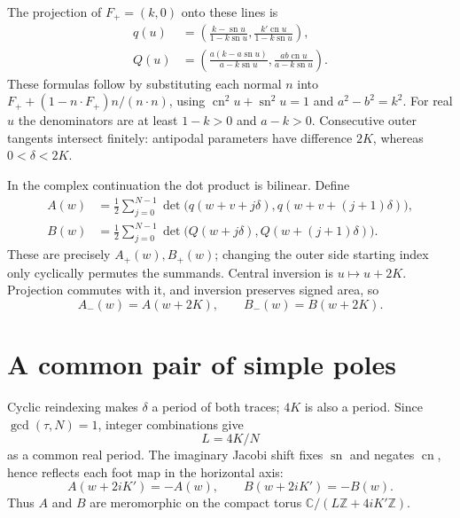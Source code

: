 \documentclass[11pt]{article}
\newcommand{\sn}{\operatorname{sn}}
\newcommand{\cn}{\operatorname{cn}}
\begin{document}
The projection of $F_+=(k,0)$ onto these lines is
\begin{align}\label{eq:q}
 q(u)&=\left(\frac{k-\sn u}{1-k\sn u},
                  \frac{k'\cn u}{1-k\sn u}\right),\\
 Q(u)&=\left(\frac{a(k-a\sn u)}{a-k\sn u},
                  \frac{ab\cn u}{a-k\sn u}\right).\label{eq:Q}
\end{align}
These formulas follow by substituting each normal $n$ into
$F_++(1-n\cdot F_+)n/(n\cdot n)$, using
$\cn^2u+\sn^2u=1$ and $a^2-b^2=k^2$.
For real $u$ the denominators are at least $1-k>0$ and $a-k>0$.
Consecutive outer tangents intersect finitely: antipodal parameters
have difference $2K$, whereas $0<\delta<2K$.

In the complex continuation the dot product is bilinear. Define
\begin{align}\label{eq:traces}
 A(w)&=\frac12\sum_{j=0}^{N-1}
  \det\bigl(q(w+v+j\delta),q(w+v+(j+1)\delta)\bigr),\\
 B(w)&=\frac12\sum_{j=0}^{N-1}
  \det\bigl(Q(w+j\delta),Q(w+(j+1)\delta)\bigr).\nonumber
\end{align}
These are precisely $A_+(w),B_+(w)$; changing the outer side starting
index only cyclically permutes the summands.
Central inversion is $u\mapsto u+2K$. Projection commutes with it,
and inversion preserves signed area, so
\begin{equation}\label{eq:focus}
 A_-(w)=A(w+2K),\qquad B_-(w)=B(w+2K).
\end{equation}

\section{A common pair of simple poles}
Cyclic reindexing makes $\delta$ a period of both traces;
$4K$ is also a period. Since $\gcd(\tau,N)=1$, integer combinations give
\begin{equation}\label{eq:L}
 L=4K/N
\end{equation}
as a common real period. The imaginary Jacobi shift fixes $\sn$
and negates $\cn$, hence reflects each foot map in the horizontal axis:
\begin{equation}\label{eq:anti}
 A(w+2iK')=-A(w),\qquad B(w+2iK')=-B(w).
\end{equation}
Thus $A$ and $B$ are meromorphic on the compact torus
$\mathbb C/(L\mathbb Z+4iK'\mathbb Z)$.
\end{document}
